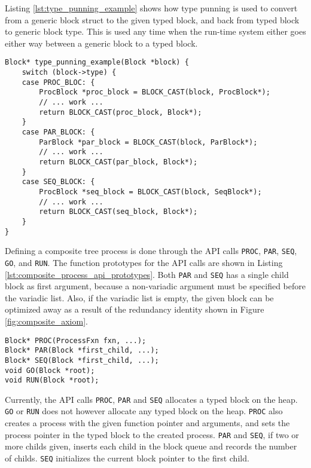 Listing \ref{lst:type_punning_example} shows how type punning is used to convert from a generic block struct to the given typed block, and back from typed block to generic block type. This is used any time when the run\hyp{}time system either goes either way between a generic block to a typed block. 

\begin{lstlisting}[style={CustomC},caption={Type punning example},label={lst:type_punning_example}]
Block* type_punning_example(Block *block) {
    switch (block->type) {
    case PROC_BLOC: {
        ProcBlock *proc_block = BLOCK_CAST(block, ProcBlock*);
        // ... work ...
        return BLOCK_CAST(proc_block, Block*);
    }
    case PAR_BLOCK: {
        ParBlock *par_block = BLOCK_CAST(block, ParBlock*);
        // ... work ...
        return BLOCK_CAST(par_block, Block*);
    }
    case SEQ_BLOCK: {
        ProcBlock *seq_block = BLOCK_CAST(block, SeqBlock*);
        // ... work ...
        return BLOCK_CAST(seq_block, Block*);
    }
}
\end{lstlisting}

Defining a composite tree process is done through the API calls \texttt{PROC}, \texttt{PAR}, \texttt{SEQ}, \texttt{GO}, and \texttt{RUN}. The function prototypes for the API calls are shown in Listing \ref{lst:composite_process_api_prototypes}. Both \texttt{PAR} and \texttt{SEQ} has a single child block as first argument, because a non\hyp{}variadic argument must be specified before the variadic list. Also, if the variadic list is empty, the given block can be optimized away as a result of the redundancy identity shown in Figure \ref{fig:composite_axiom}.

\begin{lstlisting}[style={CustomC},caption={Composite process API prototypes},label={lst:composite_process_api_prototypes}]
Block* PROC(ProcessFxn fxn, ...);
Block* PAR(Block *first_child, ...);
Block* SEQ(Block *first_child, ...);
void GO(Block *root);
void RUN(Block *root);
\end{lstlisting}

Currently, the API calls \texttt{PROC}, \texttt{PAR} and \texttt{SEQ} allocates a typed block on the heap. \texttt{GO} or \texttt{RUN} does not however allocate any typed block on the heap. \texttt{PROC} also creates a process with the given function pointer and arguments, and sets the process pointer in the typed block to the created process. \texttt{PAR} and \texttt{SEQ}, if two or more childs given, inserts each child in the block queue and records the number of childs. \texttt{SEQ} initializes the current block pointer to the first child. 

